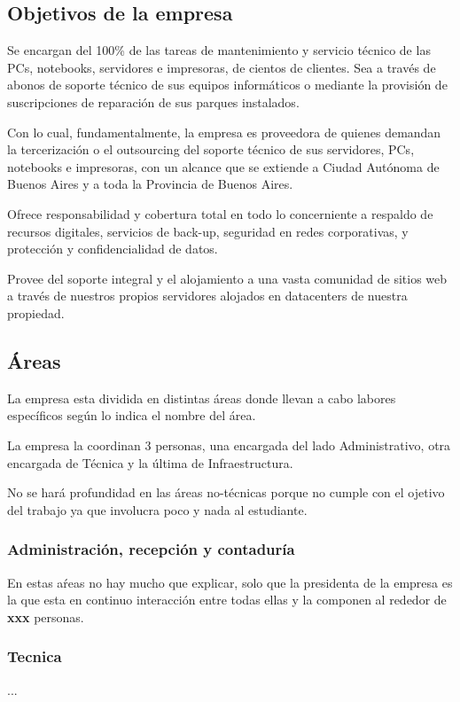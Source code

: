 \documentclass[12pt,a4paper]{article}
\begin{document}
\subsection{Objetivos de la empresa}
Se encargan del 100\% de las tareas de mantenimiento y servicio técnico de las PCs, notebooks, servidores e impresoras, de cientos de clientes. Sea a través de abonos de soporte técnico de sus equipos informáticos o mediante la provisión de suscripciones de reparación de sus parques instalados.

Con lo cual, fundamentalmente, la empresa es proveedora de quienes demandan la tercerización o el outsourcing del soporte técnico de sus servidores, PCs, notebooks e impresoras, con un alcance que se extiende a Ciudad Autónoma de Buenos Aires y a toda la Provincia de Buenos Aires.

Ofrece responsabilidad y cobertura total en todo lo concerniente a respaldo de recursos digitales, servicios de back-up, seguridad en redes corporativas, y protección y confidencialidad de datos.

Provee del soporte integral y el alojamiento a una vasta comunidad de sitios web a través de nuestros propios servidores alojados en datacenters de nuestra propiedad.

\subsection{Áreas}
La empresa esta dividida en distintas áreas donde llevan a cabo labores específicos según lo indica el nombre del área.

La empresa la coordinan 3 personas, una encargada del lado Administrativo, otra encargada de Técnica y la última de Infraestructura.

No se hará profundidad en las áreas no-técnicas porque no cumple con el ojetivo del trabajo ya que involucra poco y nada al estudiante.

\subsubsection{Administración, recepción y contaduría}
En estas aŕeas no hay mucho que explicar, solo que la presidenta de la empresa es la que esta en continuo interacción entre todas ellas y la componen al rededor de \textbf{xxx} personas.

\subsubsection{Tecnica}
...
\end{document}

